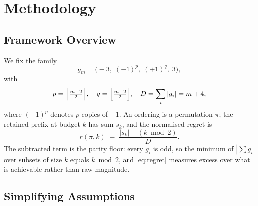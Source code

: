 \documentclass[conference]{IEEEtran}
\theoremstyle{definition}
\begin{document}
\section{Methodology}
\label{sec:setting}

\subsection{Framework Overview}

We fix the family
\begin{equation}
g_{m}=\bigl(-3,\;(-1)^{p},\;(+1)^{q},\;3\bigr),
\label{eq:family}
\end{equation}
with
\begin{equation}
p=\Bigl\lceil\tfrac{m-2}{2}\Bigr\rceil,\quad
q=\Bigl\lfloor\tfrac{m-2}{2}\Bigr\rfloor,\quad
D=\sum_{i}|g_{i}|=m+4 ,
\label{eq:familyparams}
\end{equation}
where $(-1)^{p}$ denotes $p$ copies of $-1$. An ordering is a permutation $\pi$; the retained
prefix at budget $k$ has sum $s_{k}$, and the normalised regret is
\begin{equation}
r(\pi,k)\;=\;\frac{|s_{k}|-(k \bmod 2)}{D}.
\label{eq:regret}
\end{equation}
The subtracted term is the parity floor: every $g_{i}$ is odd, so the minimum of
$|\sum g_{i}|$ over subsets of size $k$ equals $k\bmod2$, and \eqref{eq:regret} measures
excess over what is achievable rather than raw magnitude.

\subsection{Simplifying Assumptions}
\end{document}
